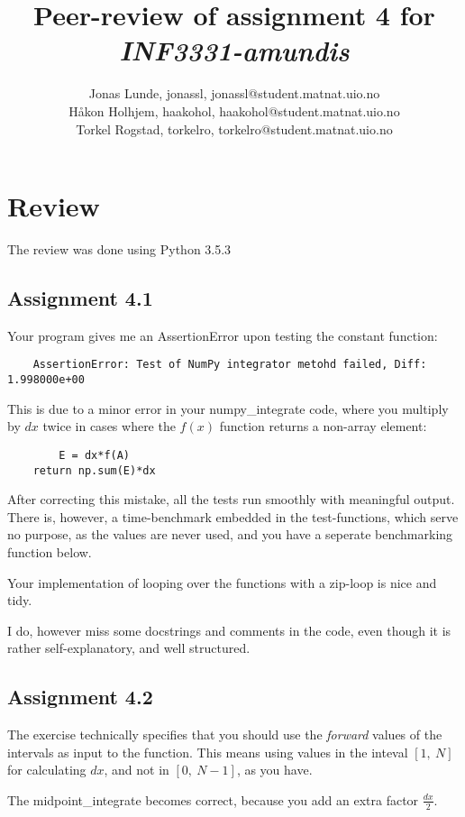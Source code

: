 \documentclass[12p,a4paper]{article}
\title{Peer-review of assignment 4 for \textit{INF3331-amundis}}
\author{Jonas Lunde, jonassl, {jonassl@student.matnat.uio.no} \\
        Håkon Holhjem, haakohol, {haakohol@student.matnat.uio.no} \\
        Torkel Rogstad, torkelro, {torkelro@student.matnat.uio.no}}
\begin{document}
\maketitle
\section*{Review}\label{sec:review}

The review was done using Python 3.5.3


\subsection*{Assignment 4.1}
Your program gives me an AssertionError upon testing the constant function:
\begin{verbatim}
    AssertionError: Test of NumPy integrator metohd failed, Diff: 1.998000e+00
\end{verbatim}
This is due to a minor error in your numpy\_integrate code, where you multiply by $dx$ twice in cases where the $f(x)$ function returns a non-array element:
\begin{verbatim}
        E = dx*f(A)
    return np.sum(E)*dx
\end{verbatim}

After correcting this mistake, all the tests run smoothly with meaningful output. There is, however, a time-benchmark embedded in the test-functions, which serve no purpose, as the values are never used, and you have a seperate benchmarking function below.

Your implementation of looping over the functions with a zip-loop is nice and tidy.

I do, however miss some docstrings and comments in the code, even though it is rather self-explanatory, and well structured.


\subsection*{Assignment 4.2} \label{sec:assignment5.2}
The exercise technically specifies that you should use the \textit{forward} values of the intervals as input to the function. This means using values in the inteval $[1,\ N]$ for calculating $dx$, and not in $[0,\ N-1]$, as you have.

The midpoint\_integrate becomes correct, because you add an extra factor $\frac{dx}{2}$.
\end{document}
